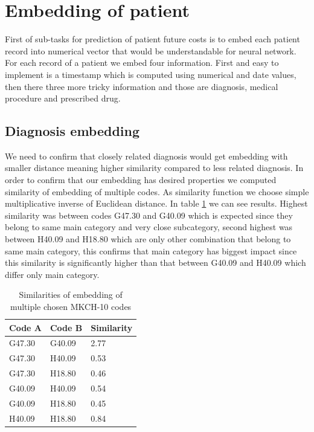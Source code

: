
\section{Embedding of patient}
\label{embeddingRes}

First of sub-tasks for prediction of patient future costs is to embed each patient record into numerical vector that would be understandable for neural network. For each record of a patient we embed four information. First and easy to implement is a timestamp which is computed using numerical and date values, then there three more tricky information and those are diagnosis, medical procedure and prescribed drug. 


\subsection{Diagnosis embedding}

We need to confirm that closely related diagnosis would get embedding with smaller distance meaning higher similarity compared to less related diagnosis.
In order to confirm that our embedding has desired properties we computed similarity of embedding of multiple codes. As similarity function we choose simple multiplicative inverse of Euclidean distance. In table \ref{tab:diag_emb_show} we can see results. Highest similarity was between codes G47.30 and G40.09 which is expected since they belong to same main category and very close subcategory, second highest was between H40.09 and H18.80 which are only other combination that belong to same main category, this confirms that main category has biggest impact since this similarity is significantly higher than that between G40.09 and H40.09 which differ only main category.

\begin{table}[!h]
	\centering
	\begin{tabular}{|l|l|l|}
		\hline
		Code A & Code B & Similarity \\ \hline
		G47.30 & G40.09 & 2.77       \\ \hline
		G47.30 & H40.09 & 0.53       \\ \hline
		G47.30 & H18.80 & 0.46       \\ \hline
		G40.09 & H40.09 & 0.54       \\ \hline
		G40.09 & H18.80 & 0.45       \\ \hline
		H40.09 & H18.80 & 0.84       \\ \hline
	\end{tabular}
	\caption{Similarities of embedding of multiple chosen MKCH-10 codes}
	\label{tab:diag_emb_show}
\end{table}  

